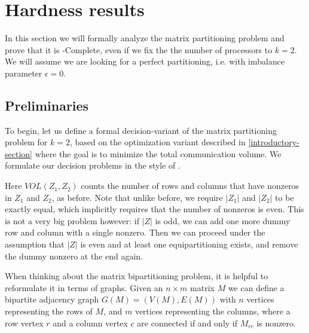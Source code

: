 \documentclass{article}
\newcommand{\mbpt}{\textsc{Matrix \allowbreak Bipartition} }
\begin{document}
	\section{Hardness results}
	In this section we will formally analyze the matrix partitioning
	problem and prove that it is \NP-Complete, even if we fix the
	the number of processors to $k = 2$. We will assume we are looking
	for a perfect partitioning, i.e. with imbalance parameter $\epsilon = 0$.

	\subsection{Preliminaries}
	\label{1-preliminaries}
	To begin, let us define a formal decision-variant of the matrix
	partitioning problem for $k = 2$, based on the optimization
	variant described in \autoref{introductory-section} where the goal
	is to minimize the total communication volume. We formulate our
	decision problems in the style of \cite{npbook}.

	\begin{problem}
		\problemtitle{\mbpt}
	\end{problem}

	Here $VOL(Z_1, Z_2)$ counts the number of rows and columns that
	have nonzeros in $Z_1$ and $Z_2$, as before. Note that unlike before,
	we require $|Z_1|$ and $|Z_2|$ to be exactly equal, which implicitly
	requires that the number of nonzeros is even. This is not a very big
	problem however: if $|Z|$ is odd, we can add one more dummy row and column
	with a single nonzero. Then we can proceed under the assumption that $|Z|$
	is even and at least one equipartitioning exists, and remove the dummy
	nonzero at the end again.

	When thinking about the matrix bipartitioning problem, it is helpful
	to reformulate it in terms of graphs. Given an $n \times m$ matrix $M$
	we can define a bipartite adjacency graph $G(M) = (V(M), E(M))$ with
	$n$ vertices representing the rows of $M$, and $m$ vertices representing
	the columns, where a row vertex $r$ and a column vertex $c$ are connected
	if and only if $M_{rc}$ is nonzero.
\end{document}
